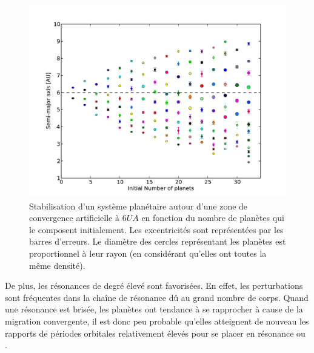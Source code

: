 \begin{figure}[htbp]
\centering
\includegraphics[width=0.75\linewidth]{figure/MMR_number.pdf}
\caption{Stabilisation d'un système planétaire autour d'une zone de convergence artificielle à $6\unit{UA}$ en fonction du
nombre de planètes qui le composent initialement. Les excentricités sont représentées par les barres d'erreurs. Le diamètre des cercles représentant les planètes est proportionnel à leur rayon (en considérant qu'elles ont toutes la même
densité).}\label{fig:MMR_number}
\end{figure}

De plus, les résonances de degré élevé sont favorisées. En effet, les perturbations sont fréquentes dans la chaîne de résonance dû au grand nombre de corps. Quand une résonance est brisée, les planètes ont tendance à se rapprocher à cause de la migration convergente, il est donc peu probable qu'elles atteignent de nouveau les rapports de périodes orbitales relativement élevés pour se placer en résonance  ou . 

